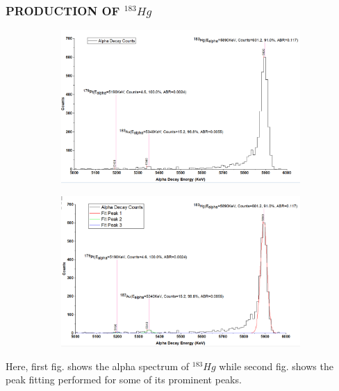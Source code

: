 \documentclass[12pt]{article}
\begin{document}
\subsubsection{PRODUCTION OF $^{183}Hg$}
\begin{figure}[h]
\centering
\begin{subfigure}
\centering
\includegraphics[scale=0.49]{Hg183.png}
\end{subfigure}
\hfill
\begin{subfigure}
\centering
\includegraphics[scale=0.49]{Hg183(Peak Fitting).png}
\end{subfigure}
\label{First fig shows the alpha spectrum of Hg 183 and second fig shows the peak fitting for its prominent peaks.}
\end{figure}
Here, first fig. shows the alpha spectrum of $^{183}Hg$ while second fig. shows the peak fitting performed for some of its prominent peaks.
\clearpage
\end{document}
